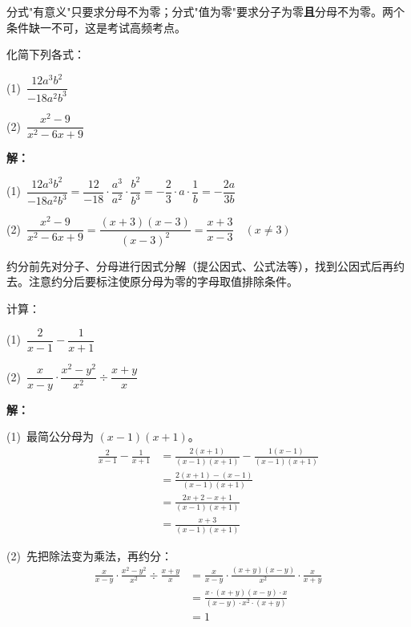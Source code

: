 \documentclass[12pt, a4paper]{ctexart}
\begin{document}
\begin{tipbox}[方法总结]
分式"有意义"只要求分母不为零；分式"值为零"要求分子为零\textbf{且}分母不为零。两个条件缺一不可，这是考试高频考点。
\end{tipbox}

\begin{examplebox}[【例题2】分式的约分与化简]
化简下列各式：

\medskip
(1)\ $\dfrac{12a^3b^2}{-18a^2b^3}$

\medskip
(2)\ $\dfrac{x^2 - 9}{x^2 - 6x + 9}$

\medskip
\textbf{解：}

(1)\ $\dfrac{12a^3b^2}{-18a^2b^3} = \dfrac{12}{-18} \cdot \dfrac{a^3}{a^2} \cdot \dfrac{b^2}{b^3} = -\dfrac{2}{3} \cdot a \cdot \dfrac{1}{b} = -\dfrac{2a}{3b}$

\medskip
(2)\ $\dfrac{x^2 - 9}{x^2 - 6x + 9} = \dfrac{(x+3)(x-3)}{(x-3)^2} = \dfrac{x+3}{x-3} \quad (x \neq 3)$
\end{examplebox}

\begin{tipbox}[方法总结]
约分前先对分子、分母进行因式分解（提公因式、公式法等），找到公因式后再约去。注意约分后要标注使原分母为零的字母取值排除条件。
\end{tipbox}

\begin{examplebox}[【例题3】分式的混合运算]
计算：

\medskip
(1)\ $\dfrac{2}{x-1} - \dfrac{1}{x+1}$

\medskip
(2)\ $\dfrac{x}{x-y} \cdot \dfrac{x^2-y^2}{x^2} \div \dfrac{x+y}{x}$

\bigskip
\textbf{解：}

(1)\ 最简公分母为 $(x-1)(x+1)$。
\begin{align*}
\frac{2}{x-1} - \frac{1}{x+1} &= \frac{2(x+1)}{(x-1)(x+1)} - \frac{1(x-1)}{(x-1)(x+1)} \\[6pt]
&= \frac{2(x+1) - (x-1)}{(x-1)(x+1)} \\[6pt]
&= \frac{2x + 2 - x + 1}{(x-1)(x+1)} \\[6pt]
&= \frac{x + 3}{(x-1)(x+1)}
\end{align*}

\medskip
(2)\ 先把除法变为乘法，再约分：
\begin{align*}
\frac{x}{x-y} \cdot \frac{x^2-y^2}{x^2} \div \frac{x+y}{x}
&= \frac{x}{x-y} \cdot \frac{(x+y)(x-y)}{x^2} \cdot \frac{x}{x+y} \\[6pt]
&= \frac{x \cdot (x+y)(x-y) \cdot x}{(x-y) \cdot x^2 \cdot (x+y)} \\[6pt]
&= 1
\end{align*}
\end{examplebox}
\end{document}
